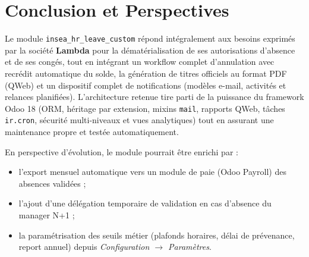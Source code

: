 \documentclass[11pt,a4paper]{article}
\begin{document}
\section{Conclusion et Perspectives}

Le module \texttt{insea\_hr\_leave\_custom} répond intégralement aux besoins exprimés par la société \textbf{Lambda} pour la dématérialisation de ses autorisations d'absence et de ses congés, tout en intégrant un workflow complet d'annulation avec recrédit automatique du solde, la génération de titres officiels au format PDF (QWeb) et un dispositif complet de notifications (modèles e-mail, activités et relances planifiées). L'architecture retenue tire parti de la puissance du framework Odoo 18 (ORM, héritage par extension, mixins \texttt{mail}, rapports QWeb, tâches \texttt{ir.cron}, sécurité multi-niveaux et vues analytiques) tout en assurant une maintenance propre et testée automatiquement.

En perspective d'évolution, le module pourrait être enrichi par :
\begin{itemize}[itemsep=2pt]
    \item l'export mensuel automatique vers un module de paie (Odoo Payroll) des absences validées ;
    \item l'ajout d'une délégation temporaire de validation en cas d'absence du manager N+1 ;
    \item la paramétrisation des seuils métier (plafonds horaires, délai de prévenance, report annuel) depuis \textit{Configuration $\rightarrow$ Paramètres}.
\end{itemize}
\end{document}
